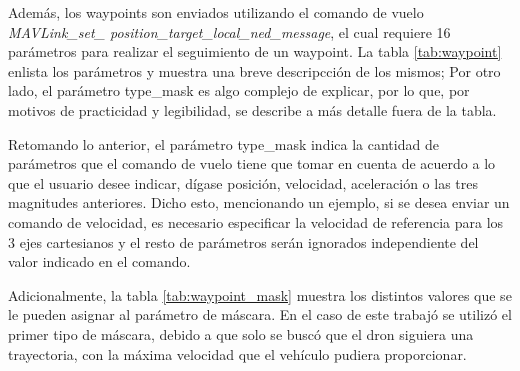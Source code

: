 Además, los waypoints son enviados utilizando el comando de vuelo \textit{MAVLink\_set\_ position\_target\_local\_ned\_message}, el cual requiere 16 parámetros para realizar el seguimiento de un waypoint. La tabla \ref{tab:waypoint} enlista los parámetros y muestra una breve descripcción de los mismos; Por otro lado, el parámetro type\_mask  es algo complejo de explicar, por lo que, por motivos de practicidad y legibilidad, se describe a más detalle fuera de la tabla.

Retomando lo anterior, el parámetro type\_mask indica la cantidad de parámetros que el comando de vuelo tiene que tomar en cuenta de acuerdo a lo que el usuario desee indicar, dígase posición, velocidad, aceleración o las tres magnitudes anteriores. Dicho esto, mencionando un ejemplo, si se desea enviar un comando de velocidad, es necesario especificar la velocidad de referencia para los 3 ejes cartesianos y el resto de parámetros serán ignorados independiente del valor indicado en el comando.

Adicionalmente, la tabla \ref{tab:waypoint_mask} muestra los distintos valores que se le pueden asignar al parámetro de máscara. En el caso de este trabajó se utilizó el primer tipo de máscara, debido a que solo se buscó que el dron siguiera una trayectoria, con la máxima velocidad que el vehículo pudiera proporcionar.

